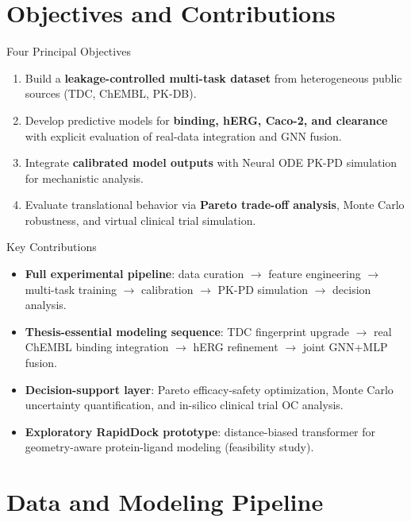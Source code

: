 \documentclass{beamer}
\begin{document}
\section{Objectives and Contributions}

\begin{frame}{Four Principal Objectives}
\begin{enumerate}
    \item Build a \textbf{leakage-controlled multi-task dataset} from heterogeneous public sources (TDC, ChEMBL, PK-DB).
    \item Develop predictive models for \textbf{binding, hERG, Caco-2, and clearance} with explicit evaluation of real-data integration and GNN fusion.
    \item Integrate \textbf{calibrated model outputs} with Neural ODE PK-PD simulation for mechanistic analysis.
    \item Evaluate translational behavior via \textbf{Pareto trade-off analysis}, Monte Carlo robustness, and virtual clinical trial simulation.
\end{enumerate}
\end{frame}

\begin{frame}{Key Contributions}
\begin{itemize}
    \item \textbf{Full experimental pipeline}: data curation $\to$ feature engineering $\to$ multi-task training $\to$ calibration $\to$ PK-PD simulation $\to$ decision analysis.
    \item \textbf{Thesis-essential modeling sequence}: TDC fingerprint upgrade $\to$ real ChEMBL binding integration $\to$ hERG refinement $\to$ joint GNN+MLP fusion.
    \item \textbf{Decision-support layer}: Pareto efficacy-safety optimization, Monte Carlo uncertainty quantification, and in-silico clinical trial OC analysis.
    \item \textbf{Exploratory RapidDock prototype}: distance-biased transformer for geometry-aware protein-ligand modeling (feasibility study).
\end{itemize}
\end{frame}

\section{Data and Modeling Pipeline}
\end{document}
